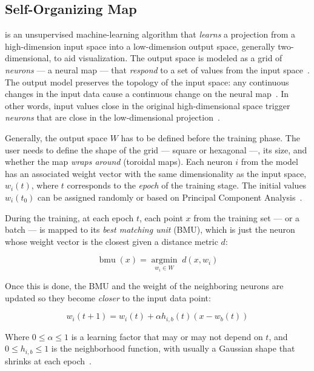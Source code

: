 \subsection{Self-Organizing Map}

 is an unsupervised machine-learning algorithm that \emph{learns}
a projection from a high-dimension input space into a low-dimension output space,
generally two-dimensional, to aid visualization.
The output space is modeled as a grid of \emph{neurons} --- a neural map ---
that \emph{respond} to a set of values from the input space~\cite{kohonen1982self}.
The output model preserves the topology of the input space: any continuous changes
in the input data cause a continuous change on the neural map~\cite{Villmann1999}.
In other words, input values close in the original high-dimensional space
trigger \emph{neurons} that are close in the low-dimensional projection~\cite{KOHONEN201352}.

Generally, the output space $W$ has to be defined before the training phase.
The user needs to define the shape of the grid --- square or hexagonal ---,
its size, and whether the map \emph{wraps around} (toroidal maps).
Each neuron $i$ from the model has an associated weight vector with the same
dimensionality as the input space, $w_{i}(t)$, where $t$ corresponds to the
\emph{epoch} of the training stage.
The initial values $w_i(t_0)$ can be assigned randomly or based on
Principal Component Analysis~\cite{KOHONEN201352}.

During the training, at each epoch $t$, each point $x$ from the training set
--- or a batch --- is mapped to its \emph{best matching unit} (BMU), which is
just the neuron whose weight vector is the closest given a distance metric $d$:

\begin{equation}
    \operatorname{bmu}(x) = \underset{w_i \in W}{\operatorname{argmin}} \; d(x, w_i)
\end{equation}

Once this is done, the BMU and the weight of the neighboring neurons are updated so they become
\emph{closer} to the input data point:

\begin{equation}
    w_i(t + 1) = w_i(t) + \alpha h_{i,b}(t) (x - w_b(t))
\end{equation}

Where $0 \le \alpha \le 1$ is a learning factor that may or may not depend on $t$,
and $0 \le h_{i,b} \le 1$ is the neighborhood function, with usually a Gaussian shape
that shrinks at each epoch~\cite{Villmann1999,wittek2013somoclu}.

